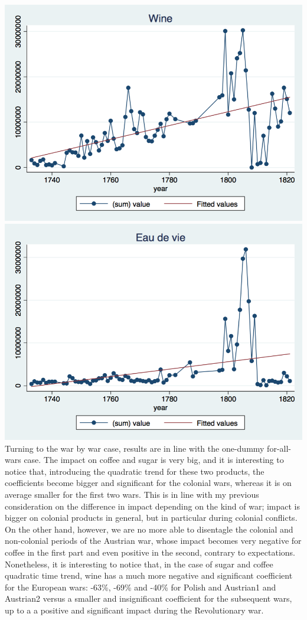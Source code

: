\documentclass[12pt,a4paper,titlepage]{article}
\begin{document}
\includegraphics[scale=.28]{wine_lfit.png}
\includegraphics[scale=.28]{eau_lfit.png}\\
Turning to the war by war case, results are in line with the one-dummy for-all-wars case. The impact on coffee and sugar is very big, and it is interesting to notice that, introducing the quadratic trend for these two products, the coefficients become bigger and significant for the colonial wars, whereas it is on average smaller for the first two wars.
This is in line with my previous consideration on the difference in impact depending on the kind of war; impact is bigger on colonial products in general, but in particular during colonial conflicts. On the other hand, however, we are no more able to disentagle the colonial and non-colonial periods of the Austrian war, whose impact becomes very negative for coffee in the first part and even positive in the second, contrary to expectations. Nonetheless, it is interesting to notice that, in the case of sugar and coffee quadratic time trend, wine has a much more negative and significant coefficient for the European wars: -63\%,  -69\% and -40\% for Polish and Austrian1 and Austrian2 versus a smaller and insignificant coefficient for the subsequent wars, up to a a positive and significant impact during the Revolutionary war. 
\end{document}
